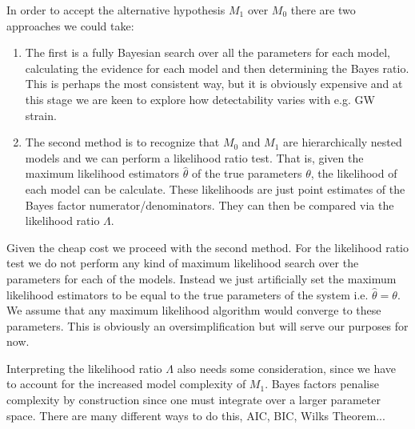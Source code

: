 \documentclass[fleqn,usenatbib,useAMS]{mnras}
\begin{document}
In order to accept the alternative hypothesis $M_1$ over $M_0$ there are two approaches we could take:

\begin{enumerate}
	\item The first is a fully Bayesian search over all the parameters for each model, calculating the evidence for each model and then determining the Bayes ratio. This is perhaps the most consistent way, but it is obviously expensive and at this stage we are keen to explore how detectability varies with e.g. GW strain.
	\item The second method is to recognize that $M_0$ and $M_1$ are hierarchically nested models and we can perform a likelihood ratio test. That is, given the maximum likelihood estimators $\hat{\theta}$ of the true parameters $\theta$, the likelihood of each model can be calculate. These likelihoods are just  point estimates of the Bayes factor numerator/denominators. They can then be compared via the likelihood ratio $\Lambda$. 
\end{enumerate}
Given the cheap cost we proceed with the second method. For the likelihood ratio test we do not perform any kind of maximum likelihood search over the parameters for each of the models. Instead we just artificially set the maximum likelihood estimators to be equal to the true parameters of the system i.e. $\hat{\theta} = \theta$. We assume that any maximum likelihood algorithm would converge to these parameters. This is obviously an oversimplification but will serve our purposes for now. \newline 


\noindent Interpreting the likelihood ratio $\Lambda$ also needs some consideration, since we have to account for the increased model complexity of $M_1$. Bayes factors penalise complexity by construction since one must integrate over a larger parameter space. There are many different ways to do this, AIC, BIC, Wilks Theorem... \newline 



\noindent 
\end{document}
